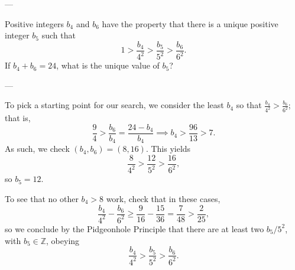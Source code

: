 
---

Positive integers $b_4$ and $b_6$ have the property that there is a unique positive integer $b_5$ such that\[1>\frac{b_4}{4^2}>\frac{b_5}{5^2}>\frac{b_6}{6^2}.\]
If $b_4+b_6=24$, what is the unique value of $b_5$?

---

To pick a starting point for our search, we consider the least $b_4$ so that $\frac{b_4}{4^2}>\frac{b_6}{6^2}$; that is, \[\frac94>\frac{b_6}{b_4}=\frac{24-b_4}{b_4}\implies b_4>\frac{96}{13}>7.\]
As such, we check $(b_4,b_6)=(8,16)$. This yields \[\frac8{4^2}>\frac{12}{5^2}>\frac{16}{6^2},\]
so $b_5=12$.

\begin{remark}
    To see that no other $b_4>8$ work, check that in these cases, \[\frac{b_4}{4^2}-\frac{b_6}{6^2}\ge\frac9{16}-\frac{15}{36}=\frac7{48}>\frac2{25},\]
    so we conclude by the Pidgeonhole Principle that there are at least two $b_5/5^2$, with $b_5\in\mathbb Z$, obeying \[\frac{b_4}{4^2}>\frac{b_5}{5^2}>\frac{b_6}{6^2}.\]
\end{remark}


